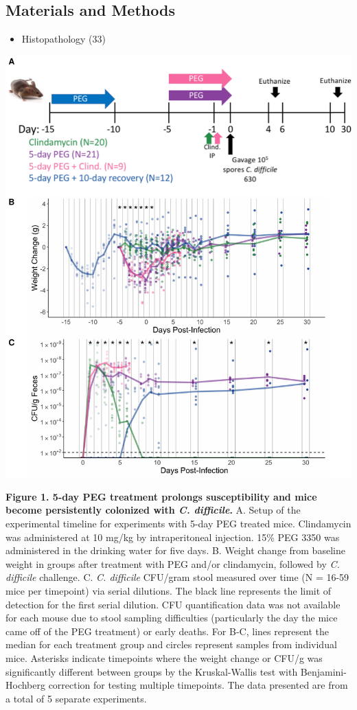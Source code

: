 \documentclass[
  11pt,
]{article}
\providecommand{\tightlist}{%
  \setlength{\itemsep}{0pt}\setlength{\parskip}{0pt}}
\begin{document}
\hypertarget{materials-and-methods}{%
\subsection{Materials and Methods}\label{materials-and-methods}}

\begin{itemize}
\tightlist
\item
  Histopathology (33)
\end{itemize}

\newpage

\includegraphics{figure_1.pdf}

\textbf{Figure 1. 5-day PEG treatment prolongs susceptibility and mice
become persistently colonized with \emph{C. difficile}.} A. Setup of the
experimental timeline for experiments with 5-day PEG treated mice.
Clindamycin was administered at 10 mg/kg by intraperitoneal injection.
15\% PEG 3350 was administered in the drinking water for five days. B.
Weight change from baseline weight in groups after treatment with PEG
and/or clindamycin, followed by \emph{C. difficile} challenge. C.
\emph{C. difficile} CFU/gram stool measured over time (N = 16-59 mice
per timepoint) via serial dilutions. The black line represents the limit
of detection for the first serial dilution. CFU quantification data was
not available for each mouse due to stool sampling difficulties
(particularly the day the mice came off of the PEG treatment) or early
deaths. For B-C, lines represent the median for each treatment group and
circles represent samples from individual mice. Asterisks indicate
timepoints where the weight change or CFU/g was significantly different
between groups by the Kruskal-Wallis test with Benjamini-Hochberg
correction for testing multiple timepoints. The data presented are from
a total of 5 separate experiments. \newpage
\end{document}
